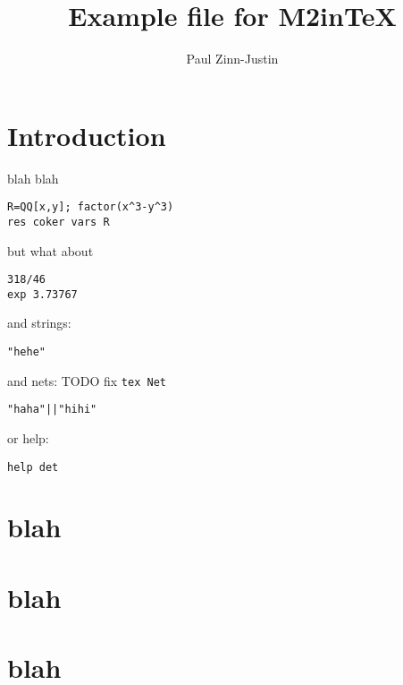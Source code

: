 \documentclass[12pt,a4paper]{amsart}
\title{Example file for M2inTeX}
\author{Paul Zinn-Justin}
\begin{document}
\maketitle

\section{Introduction}
blah blah
\begin{verbatim}
R=QQ[x,y]; factor(x^3-y^3)
res coker vars R
\end{verbatim}
but what about
\begin{verbatim}
318/46
exp 3.73767
\end{verbatim}
and strings:
\begin{verbatim}
"hehe"
\end{verbatim}
and nets: TODO fix {\tt tex Net}
\begin{verbatim}
"haha"||"hihi"
\end{verbatim}
or help:
\begin{verbatim}
help det
\end{verbatim}


\section{blah}
\section{blah}
\section{blah}
\end{document}
